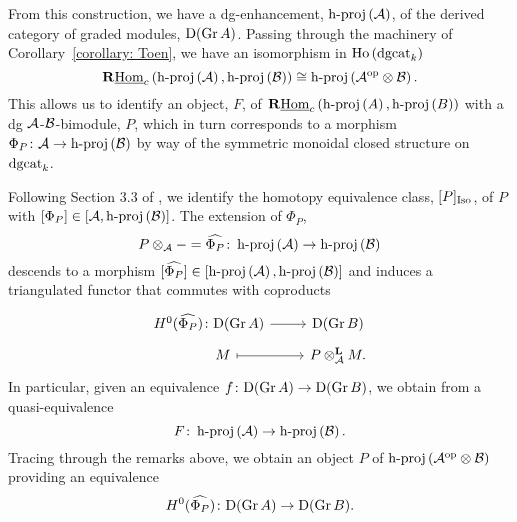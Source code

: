 From this construction, we have a dg-enhancement, \(\hproj{\A}\), of the derived category of graded modules, \(\mathrm{D}(\Gr{A})\).
Passing through the machinery of Corollary~\ref{corollary: Toen}, we have an isomorphism in \(\Ho{\dgcat{k}}\)
\[\RHomc{\hproj{\A}, \hproj{\B}} \cong \hproj{\A^\opp \otimes \B}.\]
This allows us to identify an object, \(F\), of \(\RHomc{\hproj{A}, \hproj{B}}\) with a dg \(\A\)-\(\B\)-bimodule, \(P\), which in turn corresponds to a morphism \(\Phi_P \colon \A \to \hproj{\B}\) by way of the symmetric monoidal closed structure on \(\dgcat{k}\).

Following Section 3.3 of \textcite{CS15}, we identify the homotopy equivalence class, \([P]_{\op{Iso}}\), of \(P\) with \([\Phi_P] \in [\A, \hproj{\B}]\).
The extension of \(\Phi_P\),
\[P \otimes_\A - = \widehat{\Phi_P} \colon \hproj{\A} \to \hproj{\B}\]
descends to a morphism \([\widehat{\Phi_P}] \in [\hproj{\A}, \hproj{\B}]\)
and induces a triangulated functor that commutes with coproducts
\[\begin{tikzcd}[row sep=tiny]
H^0(\widehat{\Phi_P}) \colon \mathrm{D}(\Gr{A}) \arrow{r} & \mathrm{D}(\Gr{B})\\
\quad\quad M \arrow[mapsto]{r} & P \otimes_\A^\mathbf{L} M.
\end{tikzcd}\]
In particular, given an equivalence \(f \colon \mathrm{D}(\Gr{A}) \to \mathrm{D}(\Gr{B})\), we obtain from \textcite{Lunts-Orlov} a quasi-equivalence
\[F \colon \hproj{\A} \to \hproj{\B}.\]
Tracing through the remarks above, we obtain an object \(P\) of \(\hproj{\A^\opp \otimes \B}\) providing an equivalence
\[H^0(\widehat{\Phi_P}) \colon \mathrm{D}(\Gr{A}) \to \mathrm{D}(\Gr{B}).\]


